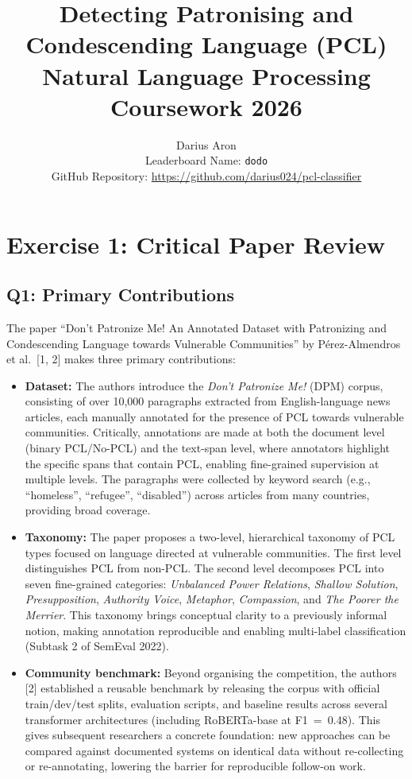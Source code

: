 \documentclass[11pt]{article}
\title{Detecting Patronising and Condescending Language (PCL) \\
Natural Language Processing Coursework 2026}
\author{Darius Aron \\
Leaderboard Name: \texttt{dodo} \\
GitHub Repository: \url{https://github.com/darius024/pcl-classifier}}
\date{}
\begin{document}
\maketitle
\thispagestyle{empty}

\newpage
\tableofcontents

\clearpage
\section{Exercise 1: Critical Paper Review}
\label{sec:review}

\subsection{Q1: Primary Contributions}

The paper ``Don't Patronize Me! An Annotated Dataset with Patronizing and Condescending Language towards Vulnerable Communities'' by Pérez-Almendros et al.\ [1, 2] makes three primary contributions:

\begin{itemize}
    \item \textbf{Dataset:} The authors introduce the \emph{Don't Patronize Me!} (DPM) corpus, consisting of over 10,000 paragraphs extracted from English-language news articles, each manually annotated for the presence of PCL towards vulnerable communities. Critically, annotations are made at both the document level (binary PCL/No-PCL) and the text-span level, where annotators highlight the specific spans that contain PCL, enabling fine-grained supervision at multiple levels. The paragraphs were collected by keyword search (e.g., ``homeless'', ``refugee'', ``disabled'') across articles from many countries, providing broad coverage.

    \item \textbf{Taxonomy:} The paper proposes a two-level, hierarchical taxonomy of PCL types focused on language directed at vulnerable communities. The first level distinguishes PCL from non-PCL. The second level decomposes PCL into seven fine-grained categories: \emph{Unbalanced Power Relations}, \emph{Shallow Solution}, \emph{Presupposition}, \emph{Authority Voice}, \emph{Metaphor}, \emph{Compassion}, and \emph{The Poorer the Merrier}. This taxonomy brings conceptual clarity to a previously informal notion, making annotation reproducible and enabling multi-label classification (Subtask 2 of SemEval 2022).

    \item \textbf{Community benchmark:} Beyond organising the competition, the authors [2] established a reusable benchmark by releasing the corpus with official train/dev/test splits, evaluation scripts, and baseline results across several transformer architectures (including RoBERTa-base at F1~=~0.48). This gives subsequent researchers a concrete foundation: new approaches can be compared against documented systems on identical data without re-collecting or re-annotating, lowering the barrier for reproducible follow-on work.
\end{itemize}
\end{document}
